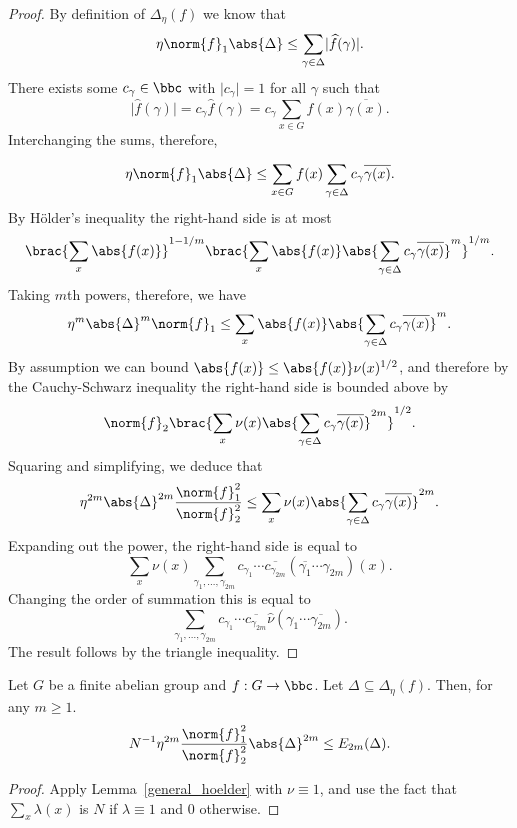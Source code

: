 \begin{proof}
\leanok
By definition of $\Delta_\eta(f)$ we know that
\[\eta\norm{f}_1\abs{\Delta}\le \sum_{\gamma\in\Delta} \lvert \widehat{f}(\gamma)\rvert.\]
There exists some $c_\gamma\in\bbc$ with $\lvert c_\gamma\rvert=1$ for all $\gamma$ such that
\[\lvert \widehat{f}(\gamma)\rvert=c_\gamma\widehat{f}(\gamma)=c_\gamma \sum_{x\in G}f(x)\overline{\gamma(x)}.\]
Interchanging the sums, therefore,

\[\eta\norm{f}_1\abs{\Delta}\le \sum_{x\in G}f(x)\sum_{\gamma\in\Delta} c_\gamma \overline{\gamma(x)}.\]
By H\"{o}lder's inequality the right-hand side is at most
\[\brac{\sum_x \abs{f(x)}}^{1-1/m}\brac{\sum_x \abs{f(x)}\abs{\sum_{\gamma\in\Delta}c_\gamma\overline{\gamma(x)}}^m}^{1/m}.\]
Taking $m$th powers, therefore, we have
\[\eta^m\abs{\Delta}^m\norm{f}_1\le \sum_{x}\abs{f(x)}\abs{\sum_{\gamma\in\Delta}c_\gamma\overline{\gamma(x)}}^m.\]
By assumption we can bound $\abs{f(x)}\le \abs{f(x)}\nu(x)^{1/2}$, and therefore by the Cauchy-Schwarz inequality the right-hand side is bounded above by
\[\norm{f}_2\brac{\sum_x \nu(x)\abs{\sum_{\gamma\in\Delta}c_\gamma\overline{\gamma(x)}}^{2m}}^{1/2}.\]
Squaring and simplifying, we deduce that
\[\eta^{2m}\abs{\Delta}^{2m}\frac{\norm{f}_1^2}{\norm{f}_2^2}\le \sum_x \nu(x)\abs{\sum_{\gamma\in\Delta}c_\gamma\overline{\gamma(x)}}^{2m}.\]
Expanding out the power, the right-hand side is equal to
\[\sum_x \nu(x)\sum_{\gamma_1,\ldots,\gamma_{2m}}c_{\gamma_1}\cdots \overline{c_{\gamma_{2m}}} (\overline{\gamma_1}\cdots \gamma_{2m})(x).\]
Changing the order of summation this is equal to
\[\sum_{\gamma_1,\ldots,\gamma_{2m}}c_{\gamma_1}\cdots \overline{c_{\gamma_{2m}}}
\widehat{\nu}(\gamma_1\cdots \overline{\gamma_{2m}}).\]
The result follows by the triangle inequality.
\end{proof}


\begin{lemma}
\label{spec_hoelder}
\leanok
Let $G$ be a finite abelian group and $f:G\to\bbc$. Let $\Delta\subseteq \Delta_\eta(f)$. Then, for any $m\geq 1$.
\[N^{-1}\eta^{2m}\frac{\norm{f}_1^2}{\norm{f}_2^2}\abs{\Delta}^{2m}\le E_{2m}(\Delta).\]
\end{lemma}

\begin{proof}
\leanok
Apply Lemma~\ref{general_hoelder} with $\nu\equiv 1$, and use the fact that $\sum_x \lambda(x)$ is $N$ if $\lambda\equiv 1$ and $0$ otherwise.
\end{proof}


